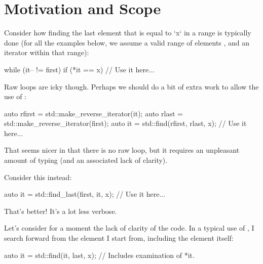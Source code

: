 \documentclass[ebook,10pt,oneside,openany,final]{memoir}
\begin{document}
\pagestyle{cpppage}



\frontmatter


\mainmatter
\setglobalstyles



\section{Motivation and Scope}

Consider how finding the last element that is equal to `x` in a range is
typically done (for all the examples below, we assume a valid range of
elements \tcode{[first, last)}, and an iterator  within that range):

\begin{itemdecl}
    while (it-- != first) {
        if (*it == x) {
            // Use it here...
        }
    }
\end{itemdecl}

Raw loops are icky though.  Perhaps we should do a bit of extra work to allow
the use of :

\begin{itemdecl}
    auto rfirst = std::make_reverse_iterator(it);
    auto rlast = std::make_reverse_iterator(first);
    auto it = std::find(rfirst, rlast, x);
    // Use it here...
\end{itemdecl}

That seems nicer in that there is no raw loop, but it requires an unpleasant
amount of typing (and an associated lack of clarity).

Consider this instead:

\begin{itemdecl}
    auto it = std::find_last(first, it, x);
    // Use it here...
\end{itemdecl}

That's better!  It's a lot less verbose.

Let's consider for a moment the lack of clarity of the
 code.  In a typical use of , I
search forward from the element I start from, including the element itself:

\begin{itemdecl}
    auto it = std::find(it, last, x); // Includes examination of *it.
\end{itemdecl}
\end{document}
